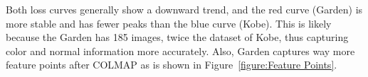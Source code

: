 Both loss curves generally show a downward trend, and the red curve (Garden) is more stable and has fewer peaks than the blue curve (Kobe). This is likely because the Garden has 185 images, twice the dataset of Kobe, thus capturing color and normal information more accurately. Also, Garden captures way more feature points after COLMAP as is shown in Figure~\ref{figure:Feature Points}.




